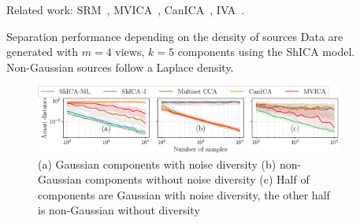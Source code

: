 \documentclass[final]{beamer}
\newlength{\sepwid}
\newlength{\onecolwid}
\newlength{\onecolwidtwo}
\newlength{\onecolwidthree}
\begin{document}
\begin{frame}[t]
\begin{columns}[t]
\begin{column}{\onecolwidtwo}
  \vspace{1em}
  Related work: SRM~\cite{chen2015reduced}, MVICA~\cite{richard2020modeling},
  CanICA~\cite{varoquaux2010group}, IVA~\cite{anderson2014independent}.  
  \begin{block}{Separation performance depending on the density of sources}
    Data are generated with $m=4$ views, $k=5$ components using the ShICA model. Non-Gaussian sources follow a Laplace density.
    \vspace{1em}
    \begin{figure}
      \includegraphics[width=\textwidth]{./figures/identifiability.pdf}
      \caption{
        (a) Gaussian components with noise diversity
        (b) non-Gaussian components without noise diversity
        (c) Half of components are Gaussian with noise diversity, the other half is
        non-Gaussian without diversity
        }
    \end{figure}
  \end{block}


\end{column} %
\begin{column}{\sepwid}\end{column} %

\begin{column}{\onecolwidthree} %



\end{column}
\end{columns}
\end{frame}
\end{document}
